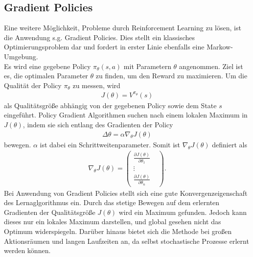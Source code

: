 	\subsection{Gradient Policies}
		Eine weitere Möglichkeit, Probleme durch Reinforcement Learning zu lösen, ist die Anwendung s.g. \glqq Gradient Policies\grqq{}. Dies stellt ein klassisches Optimierungsproblem dar und fordert in erster Linie ebenfalls eine Markow-Umgebung.\\
		Es wird eine gegebene Policy $\pi_\theta(s,a)$ mit Parametern $\theta$ angenommen. Ziel ist es, die optimalen Parameter $\theta$ zu finden, um den Reward zu maximieren. Um die Qualität der Policy $\pi_\theta$ zu messen, wird
		\begin{align}
			J(\theta) = V^{\pi_\theta}(s)
		\end{align}
		als Qualitätsgröße abhängig von der gegebenen Policy sowie dem State $s$ eingeführt. Policy Gradient Algorithmen suchen nach einem lokalen Maximum in $J(\theta)$, indem sie sich entlang des Gradienten der Policy 
		\begin{align}
			\Delta \theta = \alpha \nabla_\theta J(\theta)
		\end{align}
		bewegen. $\alpha$ ist dabei ein Schrittweitenparameter.	Somit ist $\nabla_\theta J(\theta)$ definiert als
		\begin{align}
			\nabla_\theta J(\theta) = \begin{pmatrix}
			\frac{\partial J(\theta)}{\partial \theta_1} & \\
			\vdots & \\
			\frac{\partial J(\theta)}{\partial \theta_n} & \end{pmatrix}.
		\end{align}
		Bei Anwendung von Gradient Policies stellt sich eine gute Konvergenzeigenschaft des Lernaglgorithmus ein. Durch das stetige Bewegen auf dem erlernten Gradienten der Qualitätsgröße $J(\theta)$ wird ein Maximum gefunden. Jedoch kann dieses nur ein lokales Maximum darstellen, und global gesehen nicht das Optimum widerspiegeln. Darüber hinaus bietet sich die Methode bei großen Aktionsräumen und langen Laufzeiten an, da selbst stochastische Prozesse erlernt werden können. \cite{SilverRL} 
